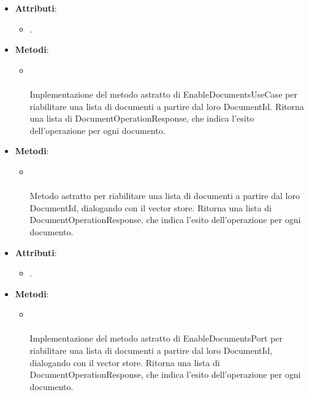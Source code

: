 \documentclass[10pt, a4paper]{article}
\begin{document}
\label{EnableDocumentsServiceDettaglio}
\begin{itemize}
    \item \textbf{Attributi}:
    \begin{itemize}
        \item {}.  
    \end{itemize}
    \item \textbf{Metodi}:
    \begin{itemize}
        \item {}\\ \\
        Implementazione del metodo astratto di EnableDocumentsUseCase per riabilitare una lista di documenti a partire dal loro DocumentId. Ritorna una lista di DocumentOperationResponse, che indica l'esito dell'operazione per ogni documento.
    \end{itemize}
\end{itemize}

\label{EnableDocumentsPortDettaglio}
\begin{itemize}
    \item \textbf{Metodi}:
    \begin{itemize}
        \item {}\\ \\
        Metodo astratto per riabilitare una lista di documenti a partire dal loro DocumentId, dialogando con il vector store. Ritorna una lista di DocumentOperationResponse, che indica l'esito dell'operazione per ogni documento.
    \end{itemize}
\end{itemize}

\label{EnableDocumentsVectorStoreDettaglio}
\begin{itemize}
    \item \textbf{Attributi}:
    \begin{itemize}
        \item {}.
    \end{itemize}
    \item \textbf{Metodi}:
    \begin{itemize}
        \item {}\\ \\
        Implementazione del metodo astratto di EnableDocumentsPort per riabilitare una lista di documenti a partire dal loro DocumentId, dialogando con il vector store. Ritorna una lista di DocumentOperationResponse, che indica l'esito dell'operazione per ogni documento.
    \end{itemize}
\end{itemize}
\end{document}
